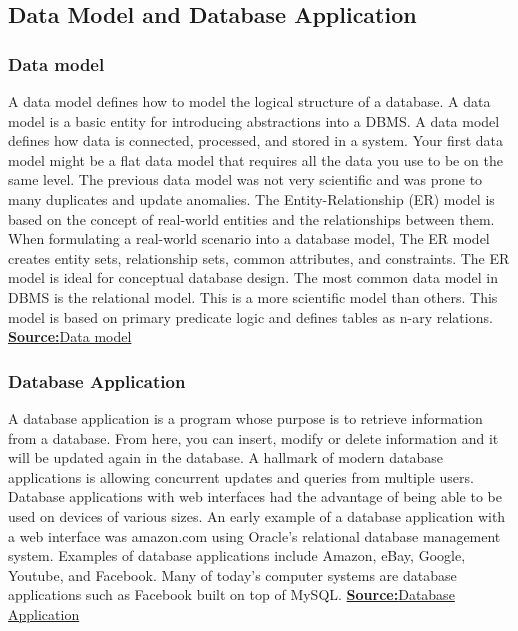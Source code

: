 \documentclass{article}
\newcounter{other}
\newcounter{concept}
\begin{document}
\subsection{Data Model and Database Application}
\subsubsection{Data model}
\hspace{\parindent}A data model defines how to model the logical structure of a database. A data model is a basic entity for introducing abstractions into a DBMS. 
A data model defines how data is connected, processed, and stored in a system. Your first data model might be a flat data model that requires all the 
data you use to be on the same level. The previous data model was not very scientific and was prone to many duplicates and update anomalies. 
The Entity-Relationship (ER) model is based on the concept of real-world entities and the relationships between them. When formulating a 
real-world scenario into a database model, The ER model creates entity sets, relationship sets, common attributes, and constraints. 
The ER model is ideal for conceptual database design. The most common data model in DBMS is the relational model. This is a more scientific model than 
others. This model is based on primary predicate logic and defines tables as n-ary relations. \newline \newline
\textbf{\underline{Source:}}\hspace{\parindent}\href{https://www.tutorialspoint.com/dbms/dbms_data_models.htm}{Data model}
\subsubsection{Database Application}
A database application is a program whose purpose is to retrieve information from a database. From here, you can insert, 
modify or delete information and it will be updated again in the database. A hallmark of modern database applications is allowing concurrent updates 
and queries from multiple users. Database applications with web interfaces had the advantage of being able to be used on devices of various sizes. 
An early example of a database application with a web interface was amazon.com using Oracle's relational database management system. 
Examples of database applications include Amazon, eBay, Google, Youtube, and Facebook. 
Many of today's computer systems are database applications such as Facebook built on top of MySQL. \newline \newline
\textbf{\underline{Source:}}\hspace{\parindent}\href{https://en.wikipedia.org/wiki/Database_application}{Database Application}
\end{document}
